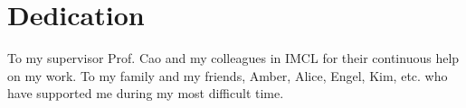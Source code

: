 \chapter*{Dedication}
To my supervisor Prof. Cao and my colleagues in IMCL for their continuous help on my work. To my family and my friends, Amber, Alice, Engel, Kim, etc. who have supported me during my most difficult time.